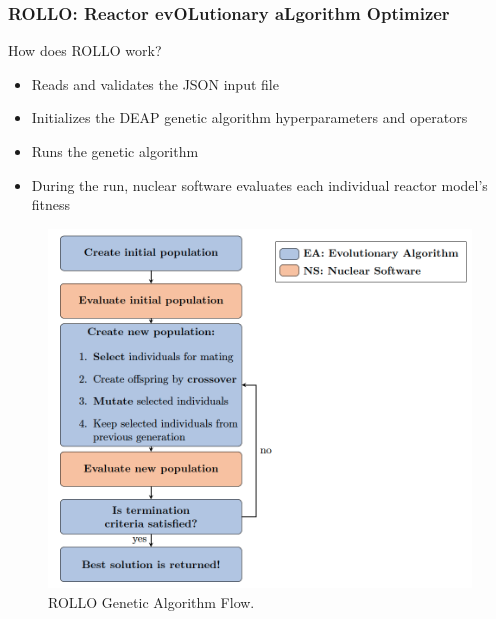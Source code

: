 \begin{frame}
    \frametitle{ROLLO: Reactor evOLutionary aLgorithm Optimizer}
    \begin{minipage}[c]{0.45\textwidth}
        \begin{block}{How does ROLLO work?}
        \begin{itemize}
            \item Reads and validates the JSON input file
            \item Initializes the \acrfull{DEAP} genetic algorithm hyperparameters and 
            operators 
            \item Runs the genetic algorithm  
            \item During the run, nuclear software evaluates each individual reactor 
            model's fitness
        \end{itemize}
        \end{block}
    \end{minipage}\hfill
    \begin{minipage}[c]{0.52\textwidth}
        \centering
        \begin{figure}
            \includegraphics[width=\linewidth]{figures/rollo-flow.png} 
            \caption{ROLLO Genetic Algorithm Flow.}
        \end{figure}
    \end{minipage}
\end{frame}

